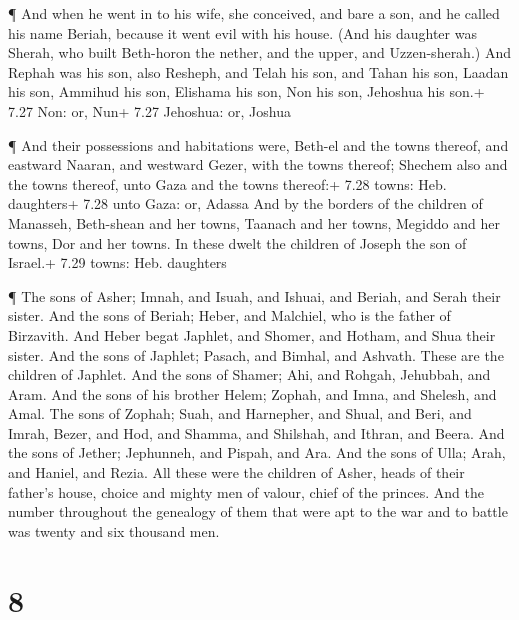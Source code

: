  ¶ And when he went in to his wife, she conceived, and bare
a son, and he called his name Beriah, because it went evil with his
house.  (And his daughter was Sherah, who built Beth-horon
the nether, and the upper, and Uzzen-sherah.)  And Rephah
was his son, also Resheph, and Telah his son, and Tahan his son,
 Laadan his son, Ammihud his son, Elishama his son,
 Non his son, Jehoshua his son.+ 7.27 Non: or, Nun+ 7.27
Jehoshua: or, Joshua

 ¶ And their possessions and habitations were, Beth-el and
the towns thereof, and eastward Naaran, and westward Gezer, with the
towns thereof; Shechem also and the towns thereof, unto Gaza and the
towns thereof:+ 7.28 towns: Heb. daughters+ 7.28 unto Gaza: or, Adassa
 And by the borders of the children of Manasseh, Beth-shean
and her towns, Taanach and her towns, Megiddo and her towns, Dor and her
towns. In these dwelt the children of Joseph the son of Israel.+ 7.29
towns: Heb. daughters

 ¶ The sons of Asher; Imnah, and Isuah, and Ishuai, and
Beriah, and Serah their sister.  And the sons of Beriah;
Heber, and Malchiel, who is the father of Birzavith.  And
Heber begat Japhlet, and Shomer, and Hotham, and Shua their sister.
 And the sons of Japhlet; Pasach, and Bimhal, and Ashvath.
These are the children of Japhlet.  And the sons of Shamer;
Ahi, and Rohgah, Jehubbah, and Aram.  And the sons of his
brother Helem; Zophah, and Imna, and Shelesh, and Amal. 
The sons of Zophah; Suah, and Harnepher, and Shual, and Beri, and Imrah,
 Bezer, and Hod, and Shamma, and Shilshah, and Ithran, and
Beera.  And the sons of Jether; Jephunneh, and Pispah, and
Ara.  And the sons of Ulla; Arah, and Haniel, and Rezia.
 All these were the children of Asher, heads of their
father's house, choice and mighty men of valour, chief of the princes.
And the number throughout the genealogy of them that were apt to the war
and to battle was twenty and six thousand men.

\hypertarget{section-7}{%
\section{8}\label{section-7}}

